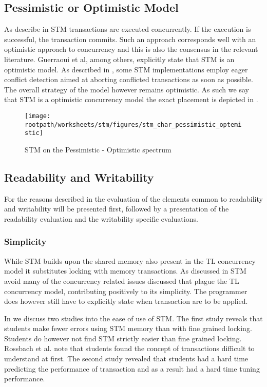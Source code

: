 \subsection{Pessimistic or Optimistic Model}
As describe in  \ac{STM} transactions are executed concurrently. If the execution is successful, the transaction commits. Such an approach corresponds well with an optimistic approach to concurrency and this is also the consensus in the relevant literature. Guerraoui et al, among others, explicitly state that \ac{STM} is an optimistic model\cite[p. 1]{guerraoui2005toward}. As described in , some \ac{STM} implementations employ eager conflict detection aimed at aborting conflicted transactions as soon as possible. The overall strategy of the model however remains optimistic. As such we say that \ac{STM} is a optimistic concurrency model the exact placement is depicted in .

\begin{figure}[htbp]
\centering
 \texttt{[image: \\rootpath/worksheets/stm/figures/stm\_char\_pessimistic\_optemistic]} 
 \caption{\ac{STM} on the Pessimistic - Optimistic spectrum}
\label{fig:stm_char_pes_opti}
\end{figure}

\subsection{Readability and Writability}
For the reasons described in  the evaluation of the elements common to readability and writability will be presented first, followed by a presentation of the readability evaluation and the writability specific evaluations.

\subsubsection{Simplicity}
\label{subsec:stm_char_simplicity}
While \ac{STM} builds upon the shared memory also present in the \ac{TL} concurrency model it substitutes locking with memory transactions. As discussed in \bsref{} \ac{STM} avoid many of the concurrency related issues discussed that plague the  \ac{TL} concurrency model, contributing positively to its simplicity. The programmer does however still have to explicitly state when transaction are to be applied.

In  we discuss two studies into the ease of use of \ac{STM}. The first study reveals that students make fewer errors using \ac{STM} memory than with fine grained locking. Students do however not find \ac{STM} strictly easier than fine grained locking. Rossbach et al. note that students found the concept of transactions difficult to understand at first. The second study revealed that students had a hard time predicting the performance of transaction and as a result had a hard time tuning performance.


